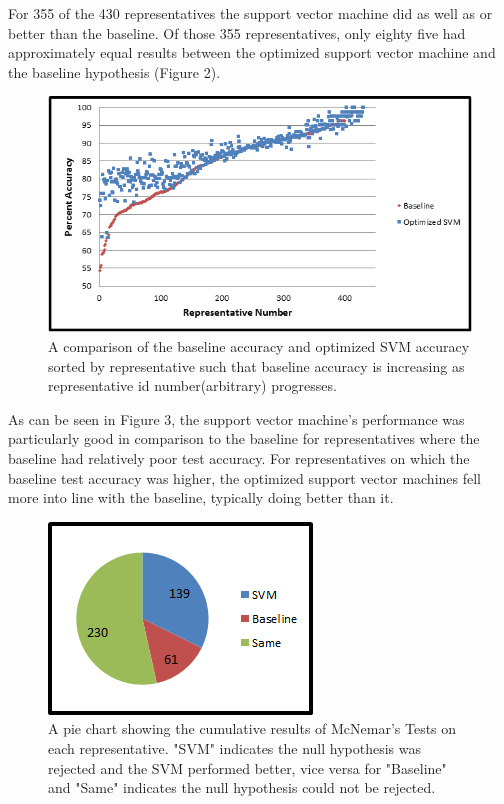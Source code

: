 \documentclass[11pt,letterpaper,twocolumn]{article}
\begin{document}
For 355 of the 430 representatives the support vector machine did as well as or better than the baseline. Of those 355 representatives, only eighty five had approximately equal results between the optimized support vector machine and the baseline hypothesis (Figure 2).

\begin{figure}[t]
\centering
\includegraphics{accuracy_comparison2.png}
\caption{A comparison of the baseline accuracy and optimized SVM accuracy sorted by representative such that baseline accuracy is increasing as representative id number(arbitrary) progresses.}
\end{figure}

As can be seen in Figure 3, the support vector machine's performance was particularly good in comparison to the baseline for representatives where the baseline had relatively poor test accuracy. For representatives on which the baseline test accuracy was higher, the optimized support vector machines fell more into line with the baseline, typically doing better than it.

\begin{figure}
\centering
\includegraphics{mcnemar_results2.png}
\caption{A pie chart showing the cumulative results of McNemar's Tests on each representative. "SVM" indicates the null hypothesis was rejected and the SVM performed better, vice versa for "Baseline" and "Same" indicates the null hypothesis could not be rejected.}
\end{figure}
\end{document}
